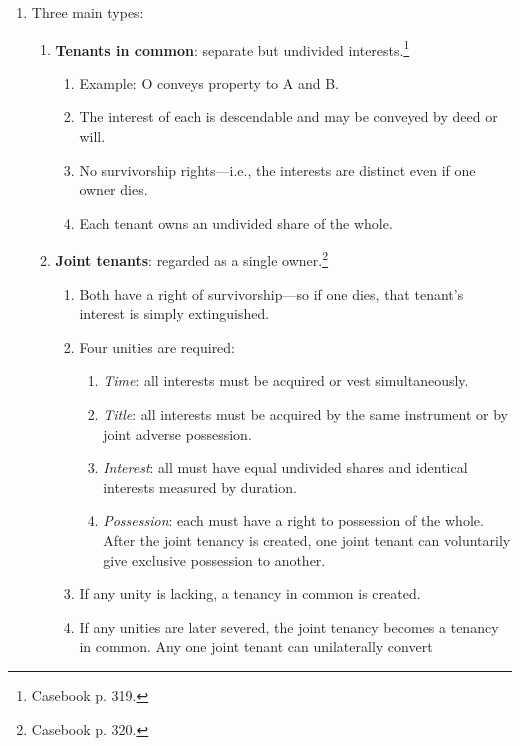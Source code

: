 \begin{enumerate}
    \item Three main types:
    \begin{enumerate}
        \item \textbf{Tenants in common}: separate but undivided 
        interests.\footnote{Casebook p. 319.}
        \begin{enumerate}
            \item Example: O conveys property to A and B.
            \item The interest of each is descendable and may be conveyed by 
            deed or will.
            \item No survivorship rights---i.e., the interests are distinct 
            even if one owner dies.
            \item Each tenant owns an undivided share of the whole.
        \end{enumerate}
        \item \textbf{Joint tenants}: regarded as a single 
        owner.\footnote{Casebook p. 320.}
        \begin{enumerate}
            \item Both have a right of survivorship---so if one dies, that 
            tenant's interest is simply extinguished.\
            \item Four unities are required:
            \begin{enumerate}
                \item \emph{Time}: all interests must be acquired or vest 
                simultaneously.
                \item \emph{Title}: all interests must be acquired by the same 
                instrument or by joint adverse possession.
                \item \emph{Interest}: all must have equal undivided shares 
                and identical interests measured by duration.
                \item \emph{Possession}: each must have a right to possession 
                of the whole. After the joint tenancy is created, one joint 
                tenant can voluntarily give exclusive possession to another.
            \end{enumerate}
            \item If any unity is lacking, a tenancy in common is created.
            \item If any unities are later severed, the joint tenancy becomes 
            a tenancy in common. Any one joint tenant can unilaterally convert 

\end{enumerate}
\end{enumerate}
\end{enumerate}
